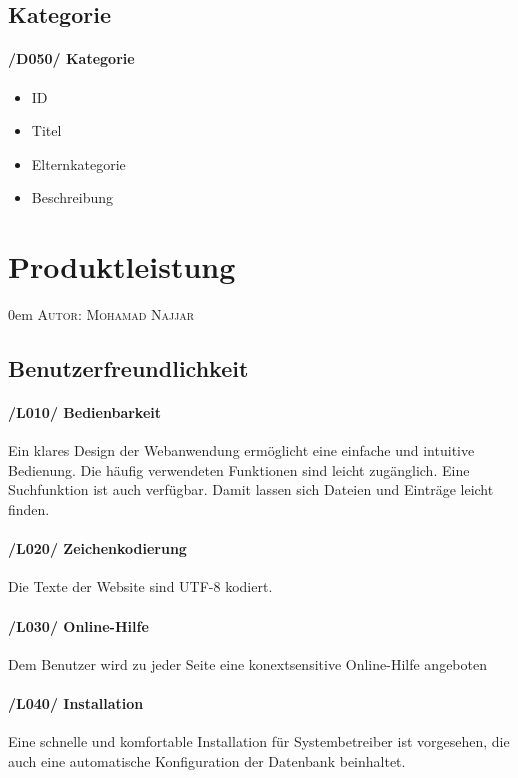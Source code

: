 \documentclass{article}
\makeatletter
\newcommand{\sectionauthor}[1]{
	{\parindent 0em \large \scshape Autor: #1 \par \nobreak \vspace*{2em}}
	\@afterheading
}
\makeatother
\begin{document}
\subsection{Kategorie}
	\label{D050} \paragraph{/D050/ Kategorie}
	\begin{itemize}
	\item ID
	\item Titel
	\item Elternkategorie
	\item Beschreibung
	\end{itemize}
	
\section{Produktleistung} %
\sectionauthor{Mohamad Najjar}

\subsection{Benutzerfreundlichkeit}

     \paragraph{/L010/ \label{L010} Bedienbarkeit}
    Ein klares Design der Webanwendung ermöglicht eine einfache und intuitive Bedienung. Die häufig verwendeten Funktionen sind leicht zugänglich. Eine Suchfunktion ist auch  verfügbar. Damit lassen sich Dateien und Einträge leicht finden.
    
     \paragraph{/L020/ \label{L020} Zeichenkodierung} Die Texte  der Website sind UTF-8 kodiert.
     
      \paragraph{/L030/  \label{L030} Online-Hilfe} Dem Benutzer wird zu jeder Seite eine konextsensitive Online-Hilfe angeboten
      
      \paragraph{/L040/ \label{040} Installation}
      Eine schnelle und komfortable Installation für Systembetreiber ist vorgesehen, die auch eine automatische Konfiguration der Datenbank beinhaltet.
      
\end{document}
